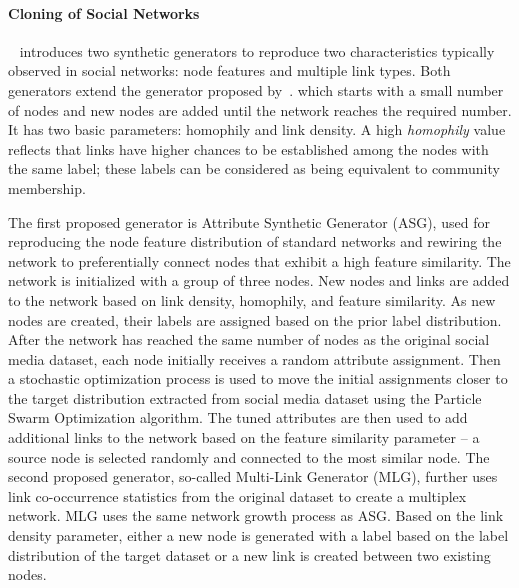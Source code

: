 \paragraph{Cloning of Social Networks} ~\cite{Sukthankar-SocialInfo2014}
introduces two synthetic generators to reproduce two characteristics typically
observed in social networks: node features and multiple link types. Both
generators extend  the generator proposed by~\cite{wang2011leveraging}.
which starts with a small number of
nodes and new nodes are added until the network reaches the required number. It
has two basic parameters: homophily and link density. A high \emph{homophily}
value reflects that links have higher chances to be established among the nodes with the
same label; these labels can be considered as being equivalent to community
membership.

The first proposed generator is Attribute Synthetic Generator (ASG), used for
reproducing the node feature distribution of standard networks and rewiring the
network to preferentially connect nodes that exhibit a high feature similarity.
The network is initialized with a group of three nodes. New nodes and links
are added to the network based on link density, homophily, and feature
similarity. As new nodes are created, their labels are assigned based on the
prior label distribution. After the network has reached the same number of nodes
as the original social media dataset, each node initially receives a random
attribute assignment. Then a stochastic optimization process is used to move the
initial assignments closer to the target distribution extracted from social
media dataset using the Particle Swarm Optimization algorithm. The tuned
attributes are then used to add additional links to the network based on the
feature similarity parameter -- a source node is selected randomly and connected
to the most similar node. The second proposed generator, so-called Multi-Link Generator
(MLG), further  uses link co-occurrence statistics from the original dataset to
create a multiplex network. MLG uses the same network growth process as ASG.
Based on the link density parameter, either a new node is generated with a label
based on the label distribution of the target dataset or a new link is created
between two existing nodes.


